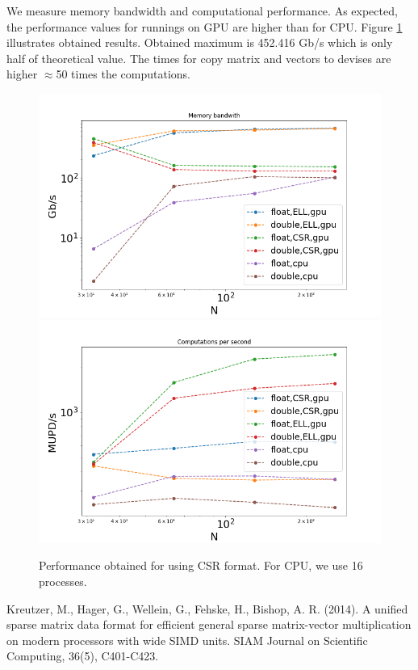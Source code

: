 \documentclass{article}
\begin{document}
 We measure memory bandwidth and computational performance. As expected, the performance values for runnings on GPU are  higher than for CPU. Figure \ref{perf} illustrates obtained results. Obtained maximum is 452.416 Gb/s which is only half of theoretical value.  The times for copy matrix and vectors to devises are higher $\approx$50 times the computations.   
 \begin{figure}[h]
	\centering
	\includegraphics[scale=0.36]{memorybandwidth.png}  \\
	\includegraphics[scale=0.36]{comp.png}  
	\caption{Performance obtained for using CSR format. For CPU, we use 16 processes.  }
	\label{perf}
\end{figure}

 
 
 \newpage
 \begin{thebibliography}{9}
 
Kreutzer, M., Hager, G., Wellein, G., Fehske, H., Bishop, A. R. (2014). A unified sparse matrix data format for efficient general sparse matrix-vector multiplication on modern processors with wide SIMD units. SIAM Journal on Scientific Computing, 36(5), C401-C423. 


 \end{thebibliography}

\end{document}
